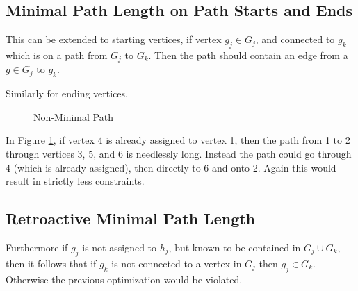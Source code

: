 \documentclass[11pt,twocolumn]{article}
\begin{document}
\subsection{Minimal Path Length on Path Starts and Ends}
This can be extended to starting vertices, if vertex $g_j \in G_j$,
  and connected to $g_k$ which is on a path from $G_j$ to $G_k$.
Then the path should contain an edge from a $g \in G_j$ to $g_k$.

Similarly for ending vertices.

\begin{figure}[H]
\caption{\label{fig:min path 2.1}Non-Minimal Path}
\end{figure}

In Figure \ref{fig:min path 2.1}, if vertex 4 is already assigned to vertex 1,
 then the path from 1 to 2 through vertices 3, 5, and 6 is needlessly long.
Instead the path could go through 4 (which is already assigned), then directly to 6 and onto 2.
Again this would result in strictly less constraints.


\subsection{Retroactive Minimal Path Length}
Furthermore if $g_j$ is not assigned to $h_j$, but known to be contained in $G_j \cup G_k$,
  then it follows that if $g_k$ is not connected to a vertex in $G_j$ then $g_j \in G_k$.
Otherwise the previous optimization would be violated.
\end{document}
